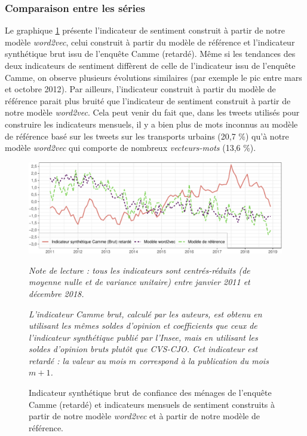 \documentclass[11pt,french,french]{article}
\begin{document}
\subsubsection{Comparaison entre les séries}\label{subsec:compseries}

Le graphique \ref{fig:bslogcam} présente l'indicateur de sentiment
construit à partir de notre modèle \emph{word2vec}, celui construit à
partir du modèle de référence et l'indicateur synthétique brut issu de
l'enquête Camme (retardé). Même si les tendances des deux indicateurs de
sentiment diffèrent de celle de l'indicateur issu de l'enquête Camme, on
observe plusieurs évolutions similaires (par exemple le pic entre mars
et octobre 2012). Par ailleurs, l'indicateur construit à partir du
modèle de référence parait plus bruité que l'indicateur de sentiment
construit à partir de notre modèle \emph{word2vec}. Cela peut venir du
fait que, dans les tweets utilisés pour construire les indicateurs
mensuels, il y a bien plus de mots inconnus au modèle de référence basé
sur les tweets sur les transports urbains (20,7 \%) qu'à notre modèle
\emph{word2vec} qui comporte de nombreux \emph{vecteurs-mots} (13,6 \%).

\begin{figure}[htp]
{\centering \includegraphics[width =\textwidth]{img/rmd-graphSentiments-1}}
\captionsetup{margin=0cm,format=hang,justification=justified}
\caption{Indicateur synthétique brut de confiance des ménages de l'enquête Camme (retardé) et indicateurs mensuels de sentiment construits à partir de notre modèle \emph{word2vec} et à partir de notre modèle de référence.}\label{fig:bslogcam}
\footnotesize
\emph{Note de lecture : tous les indicateurs sont centrés-réduits (de moyenne nulle et de variance unitaire) entre janvier 2011 et décembre 2018.}

\emph{L'indicateur Camme brut, calculé par les auteurs, est obtenu en utilisant les mêmes soldes d'opinion et coefficients que ceux de l'indicateur synthétique publié par l'Insee, mais en utilisant les soldes d'opinion bruts plutôt que CVS-CJO.
Cet indicateur est retardé : la valeur au mois $m$ correspond à la publication du mois $m+1$.}
\end{figure}
\end{document}
